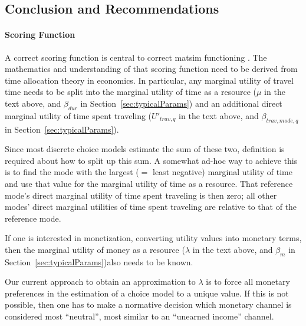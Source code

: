 
\subsection{Conclusion and Recommendations}

\paragraph*{Scoring Function}

A correct scoring function is central to correct \acrshort{matsim} functioning .
%
The mathematics and understanding of that scoring function need to be derived from time allocation theory in economics.  In particular, any marginal utility of travel time needs to be split into the marginal utility of time as a resource ($\mu$ in the text above, and $\beta_{dur}$ in Section~\ref{sec:typicalParams}) and an additional direct marginal utility of time spent traveling ($U'_{trav,q}$ in the text above, and $\beta_{trav,mode,q}$ in Section~\ref{sec:typicalParams}).

Since most discrete choice models estimate the sum of these two, definition is required about how to split up this sum.  A somewhat ad-hoc way to achieve this is to find the mode with the largest ($=$ least negative) marginal utility of time and use that value for the marginal utility of time as a resource.  That reference mode's direct marginal utility of time spent traveling is then zero; all other modes' direct marginal utilities of time spent traveling are relative to that of the reference mode.

If one is interested in monetization, \ie converting utility values into monetary terms, then the marginal utility of money as a resource ($\lambda$ in the text above, and $\beta_m$ in Section~\ref{sec:typicalParams})also needs to be known. 

Our current approach to obtain an approximation to $\lambda$ is to force all monetary preferences in the estimation of a choice model to a unique value.  If this is not possible, then one has to make a normative decision which monetary channel is considered most ``neutral'', \ie most similar to an ``unearned income'' channel.

